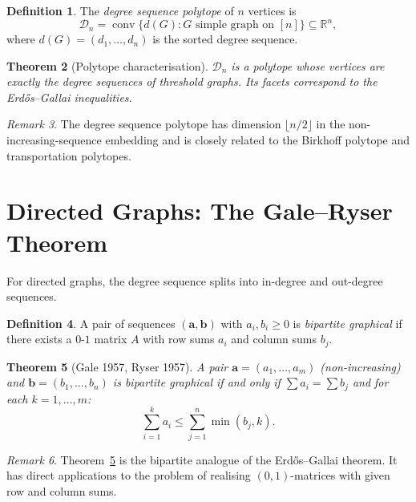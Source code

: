 \documentclass[12pt,a4paper]{amsart}
\newtheorem{theorem}{Theorem}[section]
\theoremstyle{definition}
\newtheorem{definition}[theorem]{Definition}
\theoremstyle{remark}
\newtheorem{remark}[theorem]{Remark}
\newcommand{\R}{\mathbb{R}}
\begin{document}
\begin{definition}
The \emph{degree sequence polytope} of $n$ vertices is
\[
  \mathcal{D}_n = \operatorname{conv}\{d(G) : G \text{ simple graph on } [n]\}
  \subseteq \R^n,
\]
where $d(G) = (d_1, \ldots, d_n)$ is the sorted degree sequence.
\end{definition}

\begin{theorem}[Polytope characterisation]
$\mathcal{D}_n$ is a polytope whose vertices are exactly the degree sequences
of threshold graphs.
Its facets correspond to the Erd\H{o}s--Gallai inequalities.
\end{theorem}

\begin{remark}
The degree sequence polytope has dimension $\lfloor n/2 \rfloor$ in the
non-increasing-sequence embedding and is closely related to the Birkhoff
polytope and transportation polytopes.
\end{remark}

\section{Directed Graphs: The Gale--Ryser Theorem}

For directed graphs, the degree sequence splits into in-degree and out-degree sequences.

\begin{definition}
A pair of sequences $(\mathbf{a}, \mathbf{b})$ with $a_i, b_i \geq 0$ is
\emph{bipartite graphical} if there exists a $0$-$1$ matrix $A$ with
row sums $a_i$ and column sums $b_j$.
\end{definition}

\begin{theorem}[Gale 1957, Ryser 1957]
\label{thm:GR}
A pair $\mathbf{a} = (a_1, \ldots, a_m)$ (non-increasing) and
$\mathbf{b} = (b_1, \ldots, b_n)$ is bipartite graphical if and only if
$\sum a_i = \sum b_j$ and for each $k = 1, \ldots, m$:
\[
  \sum_{i=1}^k a_i \leq \sum_{j=1}^n \min(b_j, k).
\]
\end{theorem}

\begin{remark}
Theorem~\ref{thm:GR} is the bipartite analogue of the Erd\H{o}s--Gallai theorem.
It has direct applications to the problem of realising $(0,1)$-matrices with
given row and column sums.
\end{remark}
\end{document}
